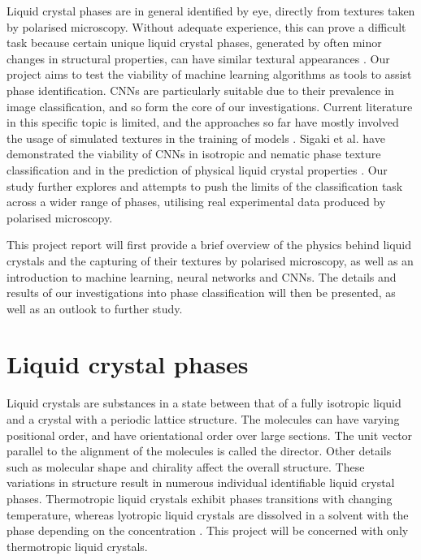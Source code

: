 \documentclass[12pt]{article}
\begin{document}
Liquid crystal phases are in general identified by eye, directly from textures taken by polarised microscopy. Without adequate experience, this can prove a difficult task because certain unique liquid crystal phases, generated by often minor changes in structural properties, can have similar textural appearances \cite{Dierking03}. Our project aims to test the viability of machine learning algorithms as tools to assist phase identification. CNNs are particularly suitable due to their prevalence in image classification, and so form the core of our investigations. Current literature in this specific topic is limited, and the approaches so far have mostly involved the usage of simulated textures in the training of models \cite{Sigaki20, Minor20}. Sigaki et al. have demonstrated the viability of CNNs in isotropic and nematic phase texture classification and in the prediction of physical liquid crystal properties \cite{Sigaki20}. Our study further explores and attempts to push the limits of the classification task across a wider range of phases, utilising real experimental data produced by polarised microscopy.

This project report will first provide a brief overview of the physics behind liquid crystals and the capturing of their textures by polarised microscopy, as well as an introduction to machine learning, neural networks and CNNs. The details and results of our investigations into phase classification will then be presented, as well as an outlook to further study.
\section{Liquid crystal phases}
Liquid crystals are substances in a state between that of a fully isotropic liquid and a crystal with a periodic lattice structure. The molecules can have varying positional order, and have orientational order over large sections. The unit vector parallel to the alignment of the molecules is called the director. Other details such as molecular shape and chirality affect the overall structure. These variations in structure result in numerous individual identifiable liquid crystal phases. Thermotropic liquid crystals exhibit phases transitions with changing temperature, whereas lyotropic liquid crystals are dissolved in a solvent with the phase depending on the concentration \cite{Demus99}. This project will be concerned with only thermotropic liquid crystals. 
\end{document}
